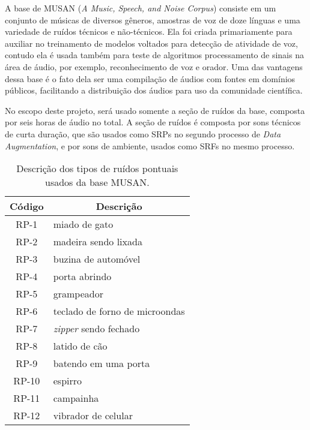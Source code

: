 A base de MUSAN (\textit{A Music, Speech, and Noise Corpus}) \cite{noiseLib} consiste em um conjunto de músicas de diversos gêneros,
amostras de voz de doze línguas e uma variedade de ruídos técnicos e não-técnicos.
Ela foi criada primariamente para auxiliar no treinamento de modelos voltados para detecção de atividade de voz, contudo ela 
é usada também para teste de algoritmos processamento de sinais na área de áudio, por exemplo, reconhecimento de voz e orador.
Uma das vantagens dessa base é o fato dela ser uma compilação de áudios com fontes em domínios públicos, facilitando a 
distribuição dos áudios para uso da comunidade científica.

No escopo deste projeto, será usado somente a seção de ruídos da base, composta por seis horas de áudio no total.
A seção de ruídos é composta por sons técnicos de curta duração, que são usados como SRPs no segundo processo de 
\textit{Data Augmentation}, e por sons de ambiente, usados como SRFs no mesmo processo.

\begin{table} [H]
    \centering
    \caption{Descrição dos tipos de ruídos pontuais usados da base MUSAN.}
    \label{tbl:noise}
    \begin{tabular}{c|l}

        \multicolumn{1}{c|}{\textbf{Código}} & \multicolumn{1}{c}{\textbf{Descrição}} \\
        \hline 

        RP-1 & miado de gato \\
        RP-2 & madeira sendo lixada \\
        RP-3 & buzina de automóvel \\
        RP-4 & porta abrindo \\
        RP-5 & grampeador \\
        RP-6 & teclado de forno de microondas \\
        RP-7 & \textit{zipper} sendo fechado \\
        RP-8 & latido de cão \\
        RP-9 & batendo em uma porta \\
        RP-10 & espirro \\
        RP-11 & campainha \\
        RP-12 & vibrador de celular \\

    \end{tabular}
\end{table}

